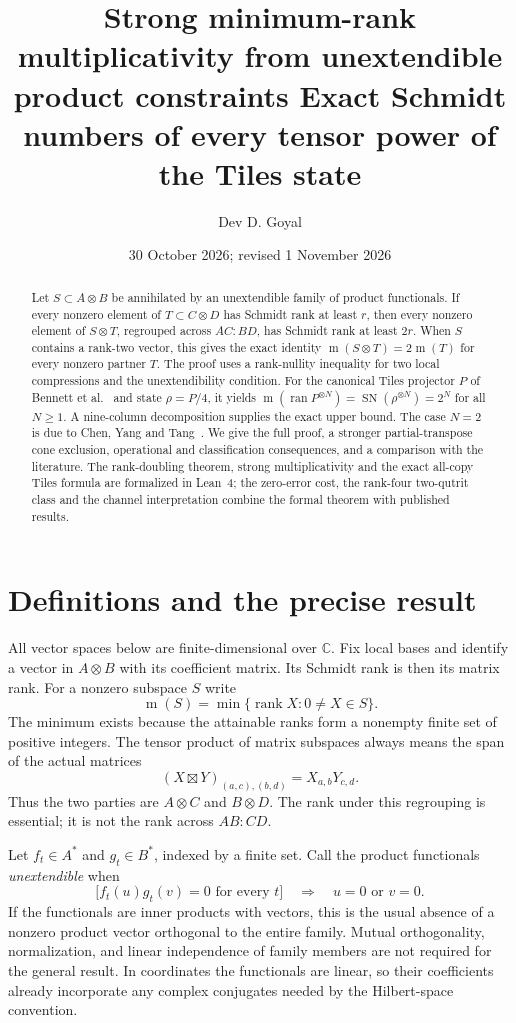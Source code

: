\documentclass[11pt]{article}
\title{Strong minimum-rank multiplicativity from\newline
unextendible product constraints\newline
\large Exact Schmidt numbers of every tensor power of the Tiles state}
\author{Dev D. Goyal}
\date{30 October 2026; revised 1 November 2026}
\theoremstyle{definition}
\newcommand{\C}{\mathbb C}
\newcommand{\rank}{\operatorname{rank}}
\newcommand{\SN}{\operatorname{SN}}
\newcommand{\ran}{\operatorname{ran}}
\newcommand{\minrank}{\operatorname{m}}
\begin{document}
\maketitle
\begin{abstract}
Let $S\subset A\otimes B$ be annihilated by an unextendible family of product
functionals. If every nonzero element of $T\subset C\otimes D$ has Schmidt
rank at least $r$, then every nonzero element of $S\otimes T$, regrouped across
$AC:BD$, has Schmidt rank at least $2r$. When $S$ contains a rank-two vector,
this gives the exact identity $\minrank(S\otimes T)=2\minrank(T)$ for every
nonzero partner $T$. The proof uses a rank-nullity inequality for two local
compressions and the unextendibility condition. For the canonical Tiles
projector $P$ of Bennett et al.~\cite{bennett1999} and state $\rho=P/4$, it yields
$\minrank(\ran P^{\otimes N})=\SN(\rho^{\otimes N})=2^N$ for all $N\ge1$.
A nine-column decomposition supplies the exact upper bound. The case $N=2$
is due to Chen, Yang and Tang~\cite{chen2017}. We give the full proof, a
stronger partial-transpose cone exclusion, operational and classification
consequences, and a comparison with the literature. The rank-doubling
theorem, strong multiplicativity and the exact all-copy Tiles formula are
formalized in Lean~4; the zero-error cost, the rank-four two-qutrit class and
the channel interpretation combine the formal theorem with published
results.
\end{abstract}

\section{Definitions and the precise result}

All vector spaces below are finite-dimensional over $\C$. Fix local bases and
identify a vector in $A\otimes B$ with its coefficient matrix. Its Schmidt
rank is then its matrix rank. For a nonzero subspace $S$ write
\[
  \minrank(S)=\min\{\rank X:0\ne X\in S\}.
\]
The minimum exists because the attainable ranks form a nonempty finite set of
positive integers. The tensor product of matrix subspaces always means the
span of the actual matrices
\begin{equation}\label{eq:coefficient}
 (X\boxtimes Y)_{(a,c),(b,d)}=X_{a,b}Y_{c,d}.
\end{equation}
Thus the two parties are $A\otimes C$ and $B\otimes D$. The rank under this
regrouping is essential; it is not the rank across $AB:CD$.

Let $f_t\in A^*$ and $g_t\in B^*$, indexed by a finite set. Call the product
functionals \emph{unextendible} when
\begin{equation}\label{eq:upb}
 \bigl[f_t(u)g_t(v)=0\text{ for every }t\bigr]
 \quad\Longrightarrow\quad u=0\text{ or }v=0.
\end{equation}
If the functionals are inner products with vectors, this is the usual
absence of a nonzero product vector orthogonal to the entire family.
Mutual orthogonality, normalization, and linear independence of family members
are not required for the general result. In coordinates the functionals are
linear, so their coefficients already incorporate any complex conjugates
needed by the Hilbert-space convention.
\end{document}
